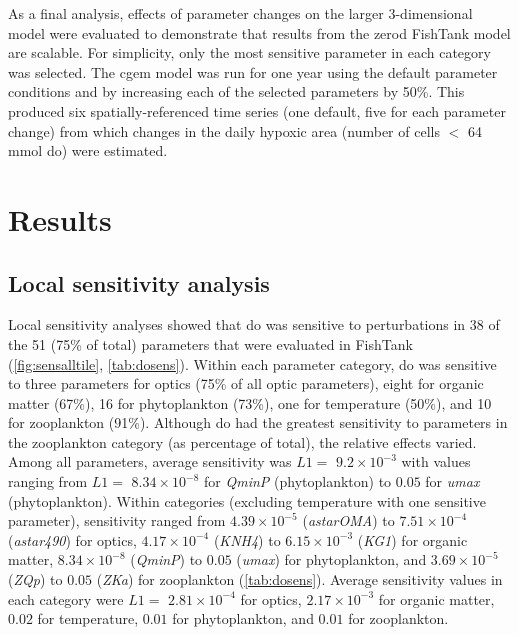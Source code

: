 \documentclass[review]{elsarticle}\usepackage[]{graphicx}\usepackage[]{color}
\begin{document}
As a final analysis, effects of parameter changes on the larger 3-dimensional model were evaluated to demonstrate that results from the \ac{zerod} FishTank model are scalable.  For simplicity, only the most sensitive parameter in each category was selected.  The \ac{cgem} model was run for one year using the default parameter conditions and by increasing each of the selected parameters by 50\%.  This produced six spatially-referenced time series (one default, five for each parameter change) from which changes in the daily hypoxic area (number of cells $<$ 64 mmol \ac{do}) were estimated.

\section{Results}


 
\subsection{Local sensitivity analysis}

Local sensitivity analyses showed that \ac{do} was sensitive to perturbations in 38 of the 51 (75\% of total) parameters that were evaluated in FishTank (\cref{fig:sensalltile}, \cref{tab:dosens}). Within each parameter category, \ac{do} was sensitive to three parameters for optics (75\% of all optic parameters), eight for organic matter (67\%), 16 for phytoplankton (73\%), one for temperature (50\%), and 10 for zooplankton (91\%). Although \ac{do} had the greatest sensitivity to parameters in the zooplankton category (as percentage of total), the relative effects varied. Among all parameters, average sensitivity was $L1 = $ $9.2\times 10^{-3}$ with values ranging from $L1 = $ $8.34\times 10^{-8}$ for \textit{QminP} (phytoplankton) to $0.05$ for \textit{umax} (phytoplankton). Within categories (excluding temperature with one sensitive parameter), sensitivity ranged from $4.39\times 10^{-5}$ (\textit{astarOMA}) to $7.51\times 10^{-4}$ (\textit{astar490}) for optics, $4.17\times 10^{-4}$ (\textit{KNH4}) to $6.15\times 10^{-3}$ (\textit{KG1}) for organic matter, $8.34\times 10^{-8}$ (\textit{QminP}) to $0.05$ (\textit{umax}) for phytoplankton, and $3.69\times 10^{-5}$ (\textit{ZQp}) to $0.05$ (\textit{ZKa}) for zooplankton (\cref{tab:dosens}).  Average sensitivity values in each category were $L1 = $ $2.81\times 10^{-4}$ for optics, $2.17\times 10^{-3}$ for organic matter, $0.02$ for temperature, $0.01$ for phytoplankton, and $0.01$ for zooplankton.
\end{document}
